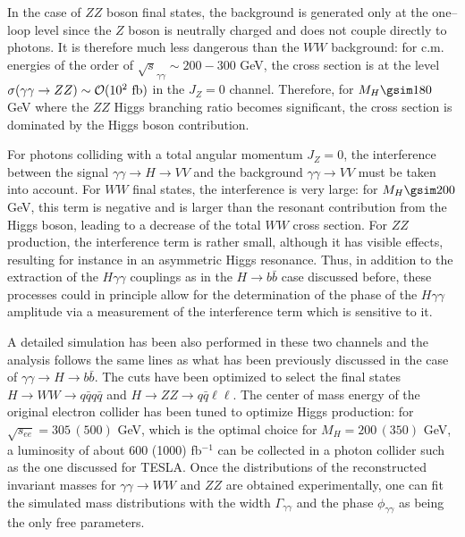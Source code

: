 In the case of $ZZ$ boson final states, the background is generated only at the
one--loop level \cite{gam-HZZ} since the $Z$ boson is neutrally charged and 
does not couple directly to photons. It is therefore much less dangerous than 
the $WW$
background: for c.m.  energies of the order of $\sqrt{s}_{\gamma \gamma} \sim
200-300$ GeV, the cross section is at the level $\sigma(\gamma \gamma \to ZZ)
\sim {\cal O}(10^2~{\rm fb})$ in the $J_Z=0$ channel. Therefore, for $M_H \gsim
180$ GeV where the $ZZ$ Higgs branching ratio becomes significant, the cross
section is dominated by the Higgs boson contribution. \s


For photons colliding with a total angular momentum $J_Z=0$, the interference
between the signal  $\gamma \gamma \to H \to VV$ and the background $\gamma
\gamma \to VV$ must be taken into account. For $WW$ final states, the
interference is very large: for $M_H \gsim 200$ GeV, this term is negative and
is larger than the resonant contribution from the Higgs boson, leading to a
decrease of the total $WW$ cross section. For $ZZ$ production, the interference
term is rather small, although it has visible effects, resulting for instance
in an asymmetric Higgs resonance.  Thus,  in addition to the extraction of the
$H\gamma \gamma$ couplings as in the $H \to b\bar{b}$ case discussed before,
these processes could in principle allow for the determination of the phase of 
the $H \gamma \gamma$ amplitude via a measurement of the interference term 
which is sensitive to it.   \s


A detailed simulation has been also performed in these two channels 
\cite{gam-HVV-Warsaw} and the analysis follows the same lines as what has 
been previously discussed in the case of $\gamma \gamma \to H \to b\bar b$. 
The cuts have been optimized to select the final states $H \to WW \to q\bar q 
q \bar q$ and $H \to ZZ \to q\bar q \ell \ell$. The center of mass energy of 
the original electron collider has been tuned to optimize Higgs production:
for $\sqrt{s_{ee}}=305\, (500)$ GeV, which is the optimal choice for $M_H=200 
\, (350)$ GeV, a luminosity of about 600 (1000) fb$^{-1}$ can be collected
in a photon collider such as the one discussed for TESLA. Once the 
distributions of the reconstructed invariant masses for $\gamma \gamma \to
WW$ and $ZZ$ are obtained experimentally, one can fit the simulated mass 
distributions with the width $\Gamma_{\gamma \gamma}$ and the phase 
$\phi_{\gamma \gamma}$ as being the only free parameters. \s

